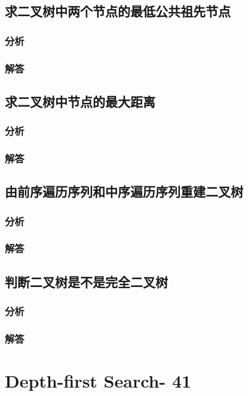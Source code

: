 \documentclass[UTF8,a4paper,12pt]{ctexbook}
\begin{document}
\section{求二叉树中两个节点的最低公共祖先节点}
	\subsection{分析}
	
	\subsection{解答}
	
\section{求二叉树中节点的最大距离}
	\subsection{分析}
	
	\subsection{解答}
	
\section{由前序遍历序列和中序遍历序列重建二叉树}
	\subsection{分析}
	
	\subsection{解答}
	
\section{判断二叉树是不是完全二叉树}
	\subsection{分析}
	
	\subsection{解答}
	
\chapter{Depth-first Search- 41}
\end{document}
